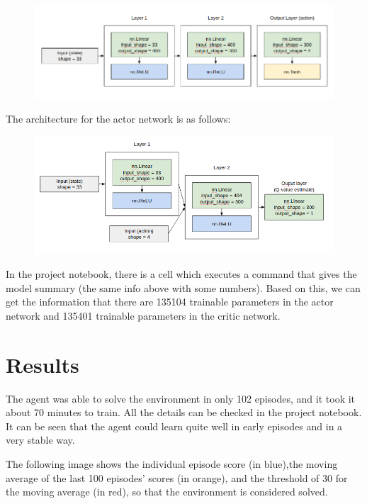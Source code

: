 \documentclass{article}
\begin{document}
\begin{figure}[H]
\centering
\includegraphics[scale=0.45]{img/actor_arch.png}
\label{fig:actor_arch}
\end{figure}

The architecture for the actor network is as follows:

\begin{figure}[H]
\centering
\includegraphics[scale=0.45]{img/critic_arch.png}
\label{fig:critic_arch}
\end{figure}

In the project notebook, there is a cell which executes a command that gives the model summary (the same info above with some numbers). Based on this, we can get the information that there are 135104 trainable parameters in the actor network and 135401 trainable parameters in the critic network.

\section{Results}

The agent was able to solve the environment in only 102 episodes, and it took it about 70 minutes to train. All the details can be checked in the project notebook. It can be seen that the agent could learn quite well in early episodes and in a very stable way.

The following image shows the individual episode score (in blue),the moving average of the last 100 episodes' scores (in orange), and the threshold of 30 for the moving average (in red), so that the environment is considered solved.
\end{document}
